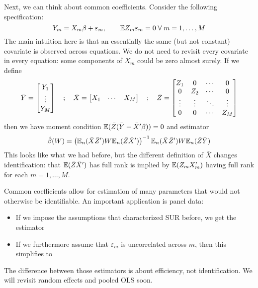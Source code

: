 \documentclass[10pt]{article}
\begin{document}
\begin{remark}
	Next, we can think about common coefficients. Consider the following specification: \[Y_m = X_m \beta + \varepsilon_m,\qquad \expect Z_m \varepsilon_m = 0 \forall m = 1,\dots,M\]The main intuition here is that an essentially the same (but not constant) covariate is observed across equations. We do not need to revisit every covariate in every equation: some components of $X_m$ could be zero almost surely. If we define \[\bar{Y}= \begin{bmatrix}Y_1 \\ \vdots \\Y_M\end{bmatrix}\quad ; \quad \bar{X} = \begin{bmatrix}X_1 & \cdots & X_M\end{bmatrix} \quad ; \quad \bar{Z} = \begin{bmatrix}Z_1 & 0 & \cdots & 0 \\ 0 & Z_2 & \cdots & 0 \\ \vdots & \vdots &\ddots &\vdots \\ 0 & 0 & \cdots & Z_M\end{bmatrix}\]then we have moment condition $\mathbb{E}(\bar{Z}(\bar{Y} - \bar{X}'\beta)) = 0$ and estimator\[\hat{\beta}(W) = \left( \mathbb{E}_n(\bar{X}\bar{Z}') W\mathbb{E}_n(\bar{Z}\bar{X}')\right)^{-1}\mathbb{E}_n(\bar{X}\bar{Z}') W\mathbb{E}_n(\bar{Z}\bar{Y})\]This looks like what we had before, but the different definition of $\bar{X}$ changes identification: that $\mathbb{E}(\bar{Z}\bar{X}')$ has full rank is implied by $\mathbb{E}(Z_mX_m')$ having full rank for each $m= 1,\dots,M$.
	
	Common coefficients allow for estimation of many parameters that would not otherwise be identifiable. An important application is panel data:
	\begin{itemize}
		\item If we impose the assumptions that characterized SUR before, we get the  estimator
		\item If we furthermore assume that $\varepsilon_m$ is uncorrelated across $m$, then this simplifies to 
	\end{itemize}
	The difference between those estimators is about efficiency, not identification. We will revisit random effects and pooled OLS soon.
\end{remark}
\end{document}
